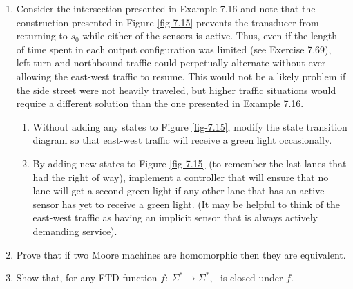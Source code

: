 \begin{enumerate}[{7.}1.]
\item Consider the intersection presented in Example 7.16 and note that the
construction presented in Figure \ref{fig-7.15} prevents the transducer from returning to
$s_0$ while either of the sensors is active. Thus, even if the length of time
spent in each output configuration was limited (see Exercise 7.69), left-turn
and northbound traffic could perpetually alternate without ever allowing the
east-west traffic to resume. This would not be a likely problem if the side
street were not heavily traveled, but higher traffic situations would require a
different solution than the one presented in Example 7.16.
\begin{enumerate}
\item Without adding any states to Figure \ref{fig-7.15}, modify the state transition
diagram so that east-west traffic will receive a green light occasionally.
\item By adding new states to Figure \ref{fig-7.15} (to remember the last lanes that had
the right of way), implement a controller that will ensure that no lane will get
a second green light if any other lane that has an active sensor has yet to
receive a green light. (It may be helpful to think of the east-west traffic as
having an implicit sensor that is always actively demanding service).
\end{enumerate}

\item Prove that if two Moore machines are homomorphic then they are equivalent.

\item Show that, for any FTD function $f$$:\ \Sigma^* \rightarrow \Sigma^*$,
\DSIG\ is closed under $f$.
\end{enumerate}
